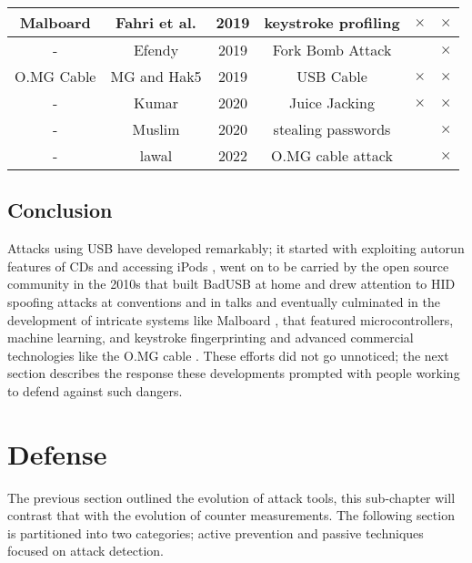 {\begin{tabular}{|c c c c c c|}
 \hline
 Malboard & Fahri et al. \cite{farhiMalboardNovelUser2019} & 2019 & keystroke profiling & $\times$ & $\times$\\
 \hline
  - & Efendy\cite{efendyExploringPossibilityUSB2019} & 2019 & Fork Bomb Attack & & $\times$ \\
 \hline
 O.MG Cable & MG and Hak5  \cite{hak5MGCable} \cite{MGCable2019a} & 2019 & USB Cable & $\times$ & $\times$ \\
 \hline
- & Kumar \cite{kumarJuiceJackingUSB2020} & 2020 & Juice Jacking & $\times$ & $\times$ \\
\hline
- & Muslim \cite{muslimImplementationAnalysisUSB2020} & 2020 & stealing passwords & & $\times$ \\
\hline
-  & lawal \cite{lawalFacilitatingCyberenabledFraud2022} & 2022 & O.MG cable attack & & $\times$ \\
 \hline 
\end{tabular}
\label{attack_table}
}

\subsection{Conclusion}

Attacks using USB have developed remarkably; it started with exploiting autorun features of CDs \cite{al-zarouniRealityRisksConsented2006}  and accessing iPods  \cite{SharpIdeasDownloads2006}, went on to be  carried by the open source community \cite{NSAPlaysetTurnipschoolHtml} in the 2010s that built BadUSB at home \cite{SamyKamkarUSBdriveby} and drew attention to HID spoofing attacks at conventions and in talks \cite{Srlabsbadusbblackhatv1Pdf2014} and eventually culminated in the development of intricate systems like Malboard \cite{farhiMalboardNovelUser2019}, that featured microcontrollers, machine learning, and keystroke fingerprinting and advanced commercial technologies like the O.MG cable \cite{hak5MGCable}. These efforts did not go unnoticed; the next section describes the response these developments prompted with people working to defend against such dangers. 



\section{Defense} \label{HistoryOfDefense}

The previous section outlined the evolution of attack tools, this sub-chapter will contrast that with the evolution of counter measurements. 
The following section is partitioned into two categories; active prevention and passive techniques focused on attack detection.

